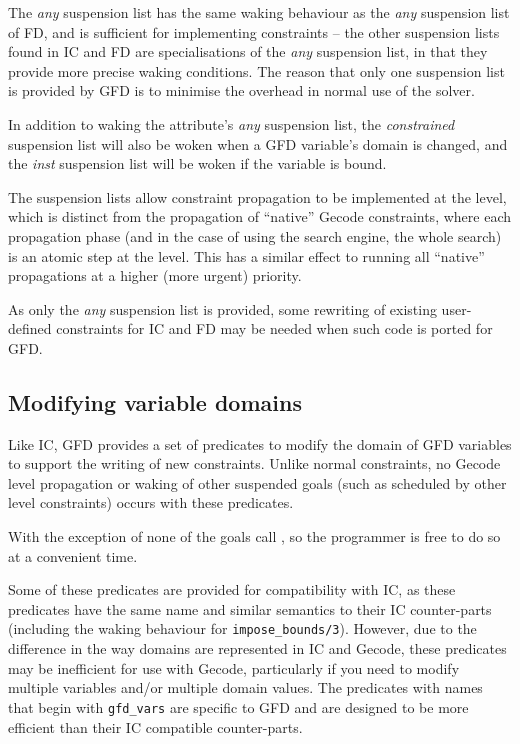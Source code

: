The {\it any\/} suspension list has the same waking behaviour as the 
{\it any\/} suspension
list of FD, and is sufficient for implementing constraints -- the other 
suspension lists found in IC and FD are specialisations of the {\it any\/} 
suspension list, in that they provide more precise waking conditions. 
The reason that
only one suspension list is provided by GFD is to minimise the overhead in
normal use of the solver. 


In addition to waking the attribute's {\it any\/} suspension list, the 
{\it constrained\/}
suspension list will also be woken when a GFD variable's domain is changed,
and the {\it inst\/} suspension list will be woken if the variable is bound.

The suspension lists allow constraint propagation to be implemented at the
{\eclipse} level, which is distinct from the propagation of ``native'' Gecode
constraints, where each propagation phase (and in the case of using the 
search engine, the whole search) is an atomic step at the {\eclipse} level. 
This has a similar effect to running all ``native'' propagations
at a higher (more urgent) priority.
 
As only the {\it any\/} suspension list is provided, some rewriting of existing
user-defined constraints for IC and FD may be needed when such code is ported
for GFD.

\subsection{Modifying variable domains}

Like IC, GFD provides a set of predicates to modify the domain of GFD 
variables to support the writing of new constraints. Unlike normal constraints,
no Gecode level propagation or waking of other suspended goals (such as 
scheduled by other {\eclipse} level constraints) occurs with these predicates.

With the exception of
 none of
the goals call , so
the programmer is free to do so at a convenient time.

Some of these predicates are provided for compatibility with IC, as these 
predicates have the same name and similar semantics to their IC counter-parts
(including the waking behaviour for {\tt impose_bounds/3}).
However, due to the difference in the way domains are represented in IC and
Gecode, these predicates may be inefficient for use with Gecode, particularly
if you need to modify multiple variables and/or multiple domain values. 
The predicates with names that begin with {\tt gfd_vars} are specific
to GFD and are designed to be more efficient than their IC compatible 
counter-parts.

